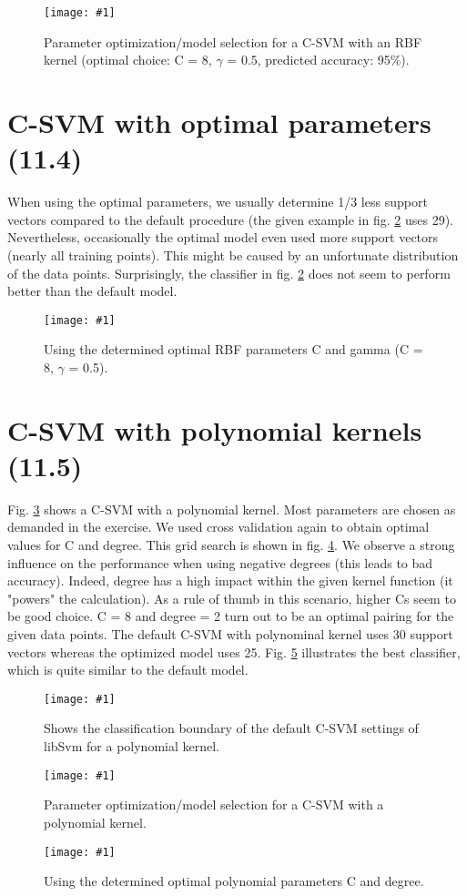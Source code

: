 \documentclass[a4paper,headings=small]{scrartcl}
\newcommand{\image}[3]{
	\begin{figure}[htbp]
		\centering
		\texttt{[image: \#1]}
		\caption{#3}
		\label{fig:#1}
	\end{figure}
}
\begin{document}
\image{out_cSvmRbfParameterOptimization}{0.9}%
	{Parameter optimization/model selection for a C-SVM with an RBF kernel (optimal choice: C = 8, $\gamma$ = 0.5, predicted accuracy: 95\%).}


\section{C-SVM with optimal parameters (11.4)}

When using the optimal parameters, we usually determine 1/3 less support vectors compared to the default procedure (the given example in fig. \ref{fig:out_classifierSvm_cSvmRbfOptimalParams} uses 29). Nevertheless, occasionally the optimal model even used more support vectors (nearly all training points). This might be caused by an unfortunate distribution of the data points. Surprisingly, the classifier in fig. \ref{fig:out_classifierSvm_cSvmRbfOptimalParams} does not seem to perform better than the default model.

\image{out_classifierSvm_cSvmRbfOptimalParams}{0.9}%
	{Using the determined optimal RBF parameters C and gamma (C = 8, $\gamma$ = 0.5).}


\section{C-SVM with polynomial kernels (11.5)}

Fig. \ref{fig:out_classifierSvm_cSvmPolyDefault} shows a C-SVM with a polynomial kernel. Most parameters are chosen as demanded in the exercise. We used cross validation again to obtain optimal values for C and degree. This grid search is shown in fig. \ref{fig:out_cSvmPolyParameterOptimization}. We observe a strong influence on the performance when using negative degrees (this leads to bad accuracy). Indeed, degree has a high impact within the given kernel function (it "powers" the calculation). As a rule of thumb in this scenario, higher Cs seem to be good choice. C = 8 and degree = 2 turn out to be an optimal pairing for the given data points. The default C-SVM with polynominal kernel uses 30 support vectors whereas the optimized model uses 25. Fig. \ref{fig:out_classifierSvm_cSvmPolyOptimalParams} illustrates the best classifier, which is quite similar to the default model.

\image{out_classifierSvm_cSvmPolyDefault}{0.9}%
	{Shows the classification boundary of the default C-SVM settings of libSvm for a polynomial kernel.}

\image{out_cSvmPolyParameterOptimization}{0.9}%
	{Parameter optimization/model selection for a C-SVM with a polynomial kernel.}

\image{out_classifierSvm_cSvmPolyOptimalParams}{0.9}%
	{Using the determined optimal polynomial parameters C and degree.}
\end{document}
